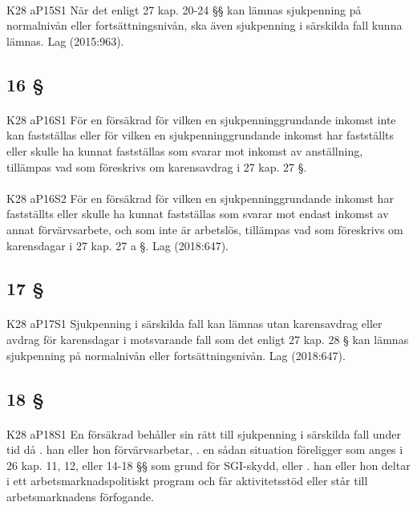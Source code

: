 \documentclass[a4paper,notitlepage,openany,10pt]{book}
\begin{document}
\paragraph*{}
{\tiny K28 aP15S1}
När det enligt 27 kap. 20-24 §§ kan lämnas sjukpenning på normalnivån eller fortsättningsnivån, ska även sjukpenning i särskilda fall kunna lämnas.
Lag (2015:963).
\subsection*{16 §}
\paragraph*{}
{\tiny K28 aP16S1}
För en försäkrad för vilken en sjukpenninggrundande inkomst inte kan fastställas eller för vilken en sjukpenninggrundande inkomst har fastställts eller skulle ha kunnat fastställas som svarar mot inkomst av anställning, tillämpas vad som föreskrivs om karensavdrag i 27 kap. 27 §.
\paragraph*{}
{\tiny K28 aP16S2}
För en försäkrad för vilken en sjukpenninggrundande inkomst har fastställts eller skulle ha kunnat fastställas som svarar mot endast inkomst av annat förvärvsarbete, och som inte är arbetslös, tillämpas vad som föreskrivs om karensdagar i 27 kap. 27 a §.
Lag (2018:647).
\subsection*{17 §}
\paragraph*{}
{\tiny K28 aP17S1}
Sjukpenning i särskilda fall kan lämnas utan karensavdrag eller avdrag för karensdagar i motsvarande fall som det enligt 27 kap. 28 § kan lämnas sjukpenning på normalnivån eller fortsättningsnivån.
Lag (2018:647).
\subsection*{18 §}
\paragraph*{}
{\tiny K28 aP18S1}
En försäkrad behåller sin rätt till sjukpenning i särskilda fall under tid då
. han eller hon förvärvsarbetar,
. en sådan situation föreligger som anges i 26 kap. 11, 12, eller 14-18 §§ som grund för SGI-skydd, eller
. han eller hon deltar i ett arbetsmarknadspolitiskt program och får aktivitetsstöd eller står till arbetsmarknadens förfogande.
\end{document}
